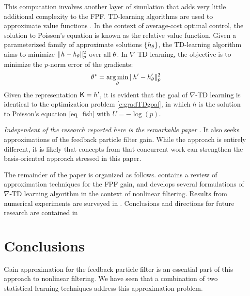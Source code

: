 This computation involves another layer of simulation that adds very little additional complexity to the FPF. 
TD-learning algorithms are used to approximate value functions \cite{bertsi96a}.  In the context of average-cost optimal control,  the solution to Poisson's equation is known as the relative value function.   Given a parameterized family of approximate solutions $\{h_\theta\}$,  the TD-learning algorithm aims to minimize $\| h - h_\theta\|_p^{2}$ over all $\theta$. In $\nabla$-TD learning, the objective is to minimize the $p$-norm error of the gradients:
\begin{equation}
\param^* = \argmin_{\param} \| h' - h_\param'\|_p^{2}
\label{e:gradTDobjective}
\end{equation}
Given the representation $\text{\sf K} = h' $,  it is evident that the goal of $\nabla$-TD learning
is identical to the optimization problem \eqref{e:gradTDgoal}, in which $h$ is the solution to Poisson's equation \eqref{eq_fish} with $U=-\log(p)$.



\textit{Independent of the research reported here is the remarkable paper \cite{tagmeh16}}.  It also seeks approximations of the  feedback particle filter gain. While the approach is entirely different,   it is likely that concepts from that concurrent work can strengthen the basis-oriented approach stressed in this paper.  



The remainder of the paper is organized as follows.     contains a review of approximation techniques for the FPF gain,  and develops several formulations of  $\nabla$-TD learning algorithm in the context of nonlinear filtering.   Results from numerical experiments are surveyed in .    Conclusions and directions for future research are contained in 





\section{Conclusions}
\label{section_conclusions}

Gain approximation for the feedback particle filter is an essential part of this approach to nonlinear filtering.  We have seen that a combination of two statistical learning techniques address this approximation problem.

